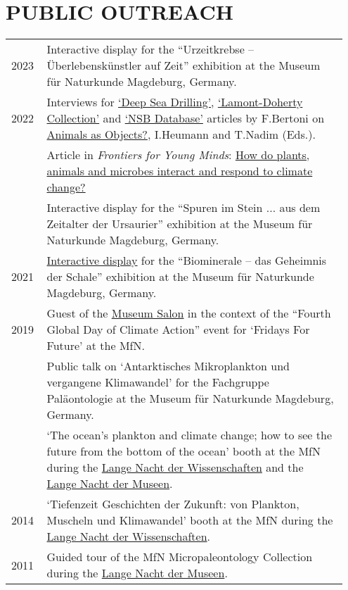 \documentclass[11pt, a4paper]{article}
\begin{document}
\section{PUBLIC OUTREACH}
\begin{longtable}{@{}p{0.1\linewidth} >{\small}P{0.85\linewidth}@{}}
2023 & Interactive display for the ``Urzeitkrebse -- Überlebenskünstler auf Zeit'' exhibition at the Museum f\"{u}r Naturkunde Magdeburg, Germany.\\
2022 & Interviews for \href{https://animalsasobjects.org/story.deep-sea-drilling/}{`Deep Sea Drilling'}, \href{https://animalsasobjects.org/material.lamont-doherty-collection/}{`Lamont-Doherty Collection'} and \href{https://animalsasobjects.org/material.nsb-database/}{`NSB Database'} articles by F.Bertoni on \href{https://animalsasobjects.org}{Animals as Objects?}, I.Heumann and T.Nadim (Eds.).\\
& Article in \textit{Frontiers for Young Minds}: \href{http://doi.org/10.3389/frym.2022.703195}{How do plants, animals and microbes interact and respond to climate change?}\\
& Interactive display for the ``Spuren im Stein ... aus dem Zeitalter der Ursaurier'' exhibition at the Museum f\"{u}r Naturkunde Magdeburg, Germany.\\
2021 & \href{https://github.com/plannapus/raup_model}{Interactive display} for the ``Biominerale -- das Geheimnis der Schale'' exhibition at the Museum f\"{u}r Naturkunde Magdeburg, Germany.\\
2019 & Guest of the \href{https://www.museumfuernaturkunde.berlin/de/museum/veranstaltungen/aktionstag-zum-globalen-klimastreik-0}{Museum Salon} in the context of the ``Fourth Global Day of Climate Action'' event for `Fridays For Future' at the MfN.\\
 & Public talk on `Antarktisches Mikroplankton und vergangene Klimawandel' for the Fachgruppe Pal\"{a}ontologie at the Museum f\"{u}r Naturkunde Magdeburg, Germany.\\
 & `The ocean’s plankton and climate change; how to see the future from the bottom of the ocean' booth at the MfN during the \href{http://www.langenachtderwissenschaften.de/}{Lange Nacht der Wissenschaften} and the \href{http://www.lange-nacht-der-museen.de/}{Lange Nacht der Museen}.\\
2014 & `Tiefenzeit Geschichten der Zukunft: von Plankton, Muscheln und Klimawandel' booth at the MfN during the \href{http://www.langenachtderwissenschaften.de/}{Lange Nacht der Wissenschaften}.\\
2011 & Guided tour of the MfN Micropaleontology Collection during the \href{http://www.lange-nacht-der-museen.de/}{Lange Nacht der Museen}.\\
\end{longtable}
\end{document}
